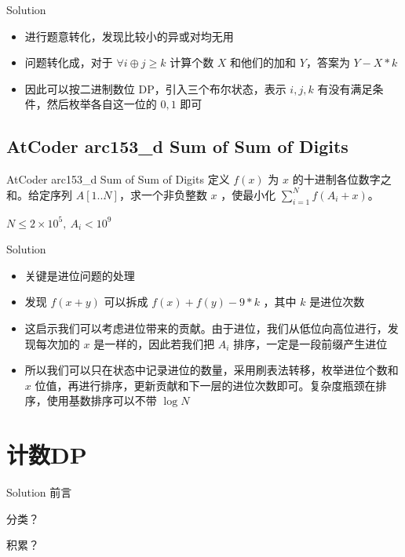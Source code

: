 ﻿\documentclass[aspectratio=169]{ctexbeamer}
\begin{document}
\begin{frame}{Solution}
    \begin{itemize}
        \item 进行题意转化，发现比较小的异或对均无用
        \item 问题转化成，对于 $\forall i\oplus j\ge k$ 计算个数 $X$ 和他们的加和 $Y$，答案为 $Y-X*k$
        \item 因此可以按二进制数位 DP，引入三个布尔状态，表示 $i,j,k$ 有没有满足条件，然后枚举各自这一位的 $0,1$ 即可
    \end{itemize}
\end{frame}

\subsection{AtCoder arc153\_d Sum of Sum of Digits}
\begin{frame}{AtCoder arc153\_d Sum of Sum of Digits}
    定义 $f(x)$ 为 $x$ 的十进制各位数字之和。给定序列 $A[1..N]$，求一个非负整数 $x$ ，使最小化 $\displaystyle\sum_{i=1}^N f(A_i+x)$。
    
    $N\le 2\times10^5,\ A_i<10^9$
\end{frame}

\begin{frame}{Solution}
    \begin{itemize}
        \item 关键是进位问题的处理
        \item 发现 $ f(x+y) $ 可以拆成 $ f(x)+f(y)-9*k $ ，其中 $ k $ 是进位次数
        \item 这启示我们可以考虑进位带来的贡献。由于进位，我们从低位向高位进行，发现每次加的 $x$ 是一样的，因此若我们把 $A_i$ 排序，一定是一段前缀产生进位
        \item 所以我们可以只在状态中记录进位的数量，采用刷表法转移，枚举进位个数和 $x$ 位值，再进行排序，更新贡献和下一层的进位次数即可。复杂度瓶颈在排序，使用基数排序可以不带 $ \log N$
    \end{itemize}
\end{frame}









\section{计数DP}

\begin{frame}{Solution}
    前言

    分类？

    积累？
\end{frame}
\end{document}

